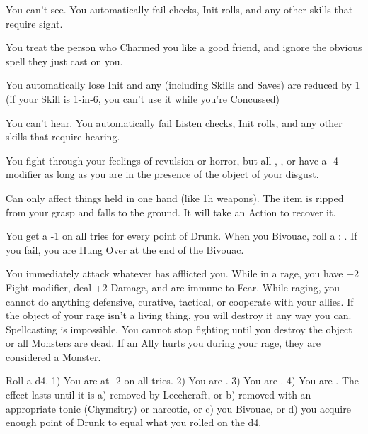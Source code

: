 {  

  You can't see.  You automatically fail \RO checks, Init rolls, and any other skills that require sight.


  You treat the person who Charmed you like a good friend, and ignore the obvious spell they just cast on you.


  You automatically lose Init and any \KNACK (including Skills and Saves) are reduced by 1 (if your Skill is 1-in-6, you can't use it while you're Concussed)


  You can't hear.  You automatically fail Listen checks, Init rolls, and any other skills that require hearing.


  You fight through your feelings of revulsion or horror, but all \RO, \RB, or \RS have a -4 modifier as long as you are in the presence of the object of your disgust.


  Can only affect things held in one hand (like 1h weapons). The item is ripped from your grasp and falls to the ground.  It will take an Action to recover it.


  You get a -1 on all \RO tries for every point of Drunk.  When you Bivouac, roll a \RS : \VIG.  If you fail, you are Hung Over at the end of the Bivouac.


  You immediately attack whatever has afflicted you. While in a rage, you have +2 Fight modifier, deal +2 Damage, and are immune to Fear. While raging, you cannot do anything defensive, curative, tactical, or cooperate with your allies. If the object of your rage isn't a living thing, you will destroy it any way you can. Spellcasting is impossible.  You cannot stop fighting until you destroy the object or all Monsters are dead.  If an Ally hurts you during your rage, they are considered a Monster.


  Roll a d4.  1) You are at -2 on all \RO tries.  2) You are .  3) You are . 4) You are .  The effect lasts until it is a) removed by Leechcraft, or b) removed with an appropriate tonic (Chymsitry) or narcotic, or c) you Bivouac, or d) you acquire enough point of Drunk to equal what you rolled on the d4.


}
